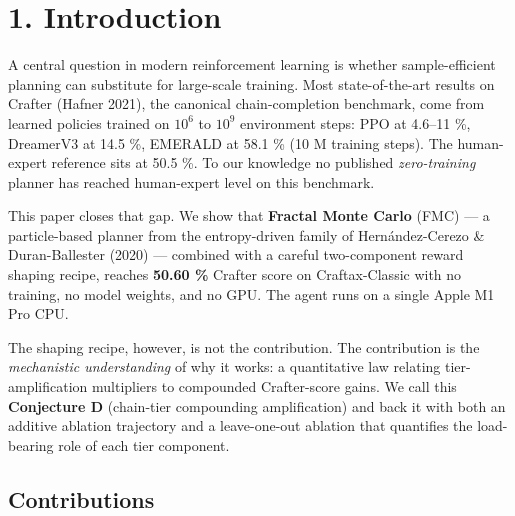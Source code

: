 \hrulefill

\section{1. Introduction}

A central question in modern reinforcement learning is whether
sample-efficient planning can substitute for large-scale training. Most
state-of-the-art results on Crafter (Hafner 2021), the canonical
chain-completion benchmark, come from learned policies trained on $10^6$
to $10^9$ environment steps: PPO at 4.6–11 \%, DreamerV3 at 14.5 \%,
EMERALD at 58.1 \% (10 M training steps). The human-expert reference
sits at 50.5 \%. To our knowledge no published \emph{zero-training} planner
has reached human-expert level on this benchmark.

This paper closes that gap. We show that \textbf{Fractal Monte Carlo} (FMC)
— a particle-based planner from the entropy-driven family of
Hernández-Cerezo \& Duran-Ballester (2020) — combined with a careful
two-component reward shaping recipe, reaches \textbf{50.60 \%} Crafter score
on Craftax-Classic with no training, no model weights, and no GPU. The
agent runs on a single Apple M1 Pro CPU.

The shaping recipe, however, is not the contribution. The contribution
is the \emph{mechanistic understanding} of why it works: a quantitative law
relating tier-amplification multipliers to compounded Crafter-score
gains. We call this \textbf{Conjecture D} (chain-tier compounding
amplification) and back it with both an additive ablation trajectory and
a leave-one-out ablation that quantifies the load-bearing role of each
tier component.

\subsection{Contributions}

